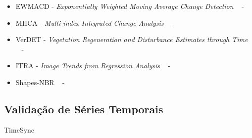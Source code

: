 \documentclass[twocolumn]{article}
\begin{document}
\begin{itemize}
  \item EWMACD - \textit{Exponentially Weighted Moving Average Change Detection} ~\cite{Brooks2014} - \lipsum[1]
  \item MIICA - \textit{Multi-index Integrated Change Analysis} ~\cite{JIN2013159} - \lipsum[1]
  \item VerDET - \textit{Vegetation Regeneration and Disturbance Estimates through Time} ~\cite{Hughes2017} - \lipsum[1]
  \item ITRA - \textit{Image Trends from Regression Analysis} ~\cite{VOGELMANN201292} - \lipsum[1]
  \item Shapes-NBR ~\cite{Meyer2013, Moisen2016} - \lipsum[1]
\end{itemize}
\lipsum[1]

\subsection{Validação de Séries Temporais}
\lipsum[1]
TimeSync ~\cite{COHEN20102911}

\begin{comment}
    Brazil made an ambitious pledge of 12 Mha as a contribution to the Bonn Challenge global target of bringing 150 and 350 Mha of  degraded/deforested lands under restoration by 2020 and 2030, respectively (www.bonnchallenge.org).
    
    It is also part of Brazil’s pledge to the Paris Climate Agreement 
    (http://www.mma.gov.br/images/arquivo/80108/BRASIL%
    INAL.pdf) and its National Policy for Native Vegetation Recovery 
    (http://www.mma.gov.br/images/arquivos/florestas/planaveg_plano_nacional_recuperacao_vegetacao_nativa.pdf).
\end{comment}




\end{document}
